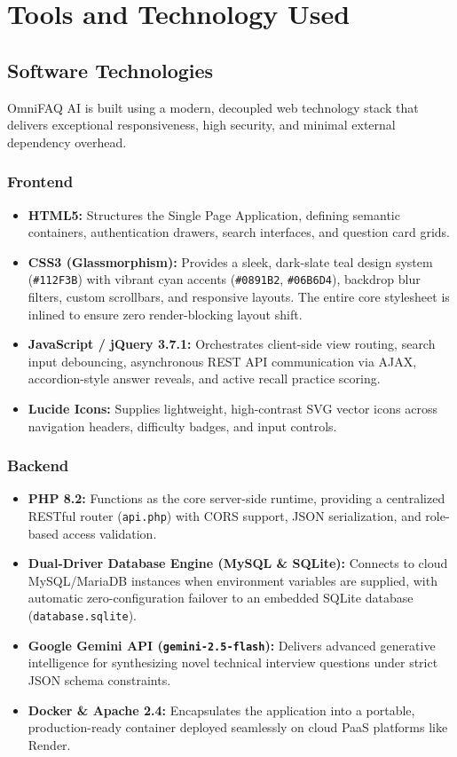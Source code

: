 \chapter{Tools and Technology Used}

\section{Software Technologies}
OmniFAQ AI is built using a modern, decoupled web technology stack that delivers exceptional responsiveness, high security, and minimal external dependency overhead.

\subsection{Frontend}
\begin{itemize}
    \item \textbf{HTML5:} Structures the Single Page Application, defining semantic containers, authentication drawers, search interfaces, and question card grids.
    \item \textbf{CSS3 (Glassmorphism):} Provides a sleek, dark-slate teal design system (\texttt{\#112F3B}) with vibrant cyan accents (\texttt{\#0891B2}, \texttt{\#06B6D4}), backdrop blur filters, custom scrollbars, and responsive layouts. The entire core stylesheet is inlined to ensure zero render-blocking layout shift.
    \item \textbf{JavaScript / jQuery 3.7.1:} Orchestrates client-side view routing, search input debouncing, asynchronous REST API communication via AJAX, accordion-style answer reveals, and active recall practice scoring.
    \item \textbf{Lucide Icons:} Supplies lightweight, high-contrast SVG vector icons across navigation headers, difficulty badges, and input controls.
\end{itemize}

\subsection{Backend}
\begin{itemize}
    \item \textbf{PHP 8.2:} Functions as the core server-side runtime, providing a centralized RESTful router (\texttt{api.php}) with CORS support, JSON serialization, and role-based access validation.
    \item \textbf{Dual-Driver Database Engine (MySQL \& SQLite):} Connects to cloud MySQL/MariaDB instances when environment variables are supplied, with automatic zero-configuration failover to an embedded SQLite database (\texttt{database.sqlite}).
    \item \textbf{Google Gemini API (\texttt{gemini-2.5-flash}):} Delivers advanced generative intelligence for synthesizing novel technical interview questions under strict JSON schema constraints.
    \item \textbf{Docker \& Apache 2.4:} Encapsulates the application into a portable, production-ready container deployed seamlessly on cloud PaaS platforms like Render.
\end{itemize}

